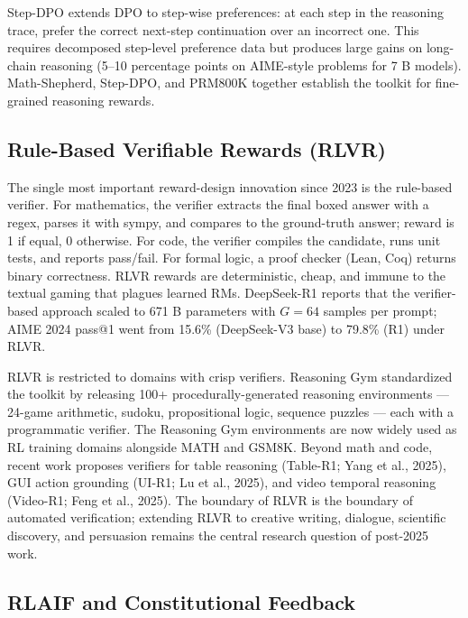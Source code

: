 \documentclass{article}
\begin{document}
Step-DPO \citep{lai20242024} extends DPO to step-wise preferences: at each step in the reasoning trace, prefer the correct next-step continuation over an incorrect one. This requires decomposed step-level preference data but produces large gains on long-chain reasoning (5--10 percentage points on AIME-style problems for 7 B models). Math-Shepherd, Step-DPO, and PRM800K together establish the toolkit for fine-grained reasoning rewards.

\subsection{Rule-Based Verifiable Rewards (RLVR)}\label{rule-based-verifiable-rewards-rlvr}

The single most important reward-design innovation since 2023 is the rule-based verifier. For mathematics, the verifier extracts the final boxed answer with a regex, parses it with sympy, and compares to the ground-truth answer; reward is 1 if equal, 0 otherwise. For code, the verifier compiles the candidate, runs unit tests, and reports pass/fail. For formal logic, a proof checker (Lean, Coq) returns binary correctness. RLVR rewards are deterministic, cheap, and immune to the textual gaming that plagues learned RMs. DeepSeek-R1 reports that the verifier-based approach scaled to 671 B parameters with \(G = 64\) samples per prompt; AIME 2024 pass@1 went from 15.6\% (DeepSeek-V3 base) to 79.8\% (R1) under RLVR.

RLVR is restricted to domains with crisp verifiers. Reasoning Gym \citep{stojanovski20252025} standardized the toolkit by releasing 100+ procedurally-generated reasoning environments --- 24-game arithmetic, sudoku, propositional logic, sequence puzzles --- each with a programmatic verifier. The Reasoning Gym environments are now widely used as RL training domains alongside MATH and GSM8K. Beyond math and code, recent work proposes verifiers for table reasoning (Table-R1; Yang et al., 2025), GUI action grounding (UI-R1; Lu et al., 2025), and video temporal reasoning (Video-R1; Feng et al., 2025). The boundary of RLVR is the boundary of automated verification; extending RLVR to creative writing, dialogue, scientific discovery, and persuasion remains the central research question of post-2025 work.

\subsection{RLAIF and Constitutional Feedback}\label{rlaif-and-constitutional-feedback}
\end{document}
